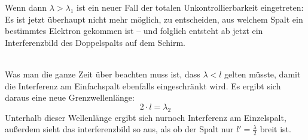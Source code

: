 Wenn dann $\lambda > \lambda_1$ ist ein neuer Fall der totalen Unkontrollierbarkeit eingetreten: Es ist jetzt überhaupt nicht mehr möglich, zu entscheiden, aus welchem Spalt ein bestimmtes Elektron gekommen ist -- und folglich entsteht ab jetzt ein Interferenzbild des Doppelspalts auf dem Schirm. 

~\\Was man die ganze Zeit über beachten muss ist, dass $\lambda < l$ gelten müsste, damit die Interferenz am Einfachspalt ebenfalls eingeschränkt wird. Es ergibt sich daraus eine neue Grenzwellenlänge:
\begin{equation}
   2 \cdot l = \lambda_2
\end{equation}
Unterhalb dieser Wellenlänge ergibt sich nurnoch Interferenz am Einzelspalt, außerdem sieht das interferenzbild so aus, als ob der Spalt nur $l' = \frac{\lambda}{2}$ breit ist.




